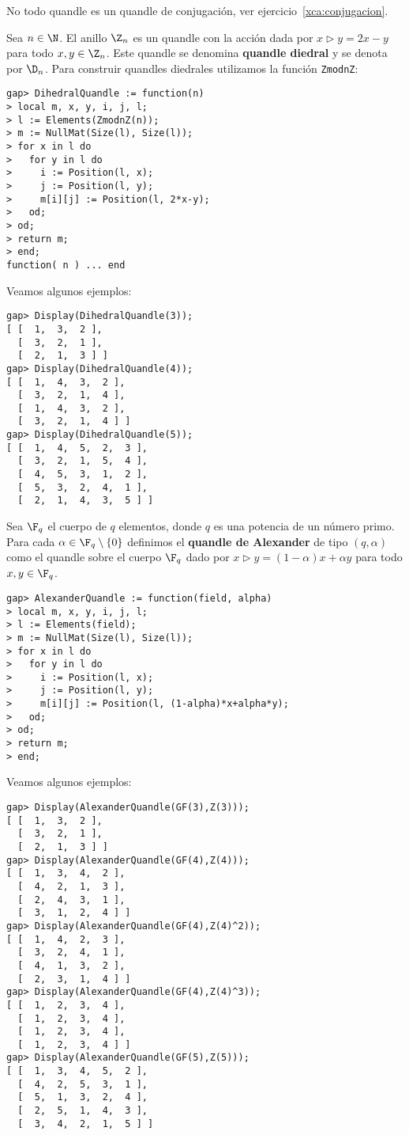 \begin{remark}
	No todo quandle es un quandle de conjugación, ver
	ejercicio~\ref{xca:conjugacion}.  
\end{remark}

\begin{example}
Sea $n\in\N$. El anillo $\Z_n$ es un quandle con la acción dada por
$x\triangleright y=2x-y$ para todo $x,y\in\Z_n$. Este quandle se denomina
\textbf{quandle diedral} y se denota por $\D_n$. Para construir quandles
diedrales utilizamos la función \lstinline{ZmodnZ}:
\begin{lstlisting}
gap> DihedralQuandle := function(n)
> local m, x, y, i, j, l;
> l := Elements(ZmodnZ(n));
> m := NullMat(Size(l), Size(l));
> for x in l do
>   for y in l do
>     i := Position(l, x);
>     j := Position(l, y);
>     m[i][j] := Position(l, 2*x-y);
>   od;
> od;
> return m;
> end;
function( n ) ... end
\end{lstlisting}
Veamos algunos ejemplos:
\begin{lstlisting}
gap> Display(DihedralQuandle(3));
[ [  1,  3,  2 ],
  [  3,  2,  1 ],
  [  2,  1,  3 ] ]
gap> Display(DihedralQuandle(4));
[ [  1,  4,  3,  2 ],
  [  3,  2,  1,  4 ],
  [  1,  4,  3,  2 ],
  [  3,  2,  1,  4 ] ]
gap> Display(DihedralQuandle(5));
[ [  1,  4,  5,  2,  3 ],
  [  3,  2,  1,  5,  4 ],
  [  4,  5,  3,  1,  2 ],
  [  5,  3,  2,  4,  1 ],
  [  2,  1,  4,  3,  5 ] ]
\end{lstlisting}
\end{example}

\begin{example}
Sea $\F_q$ el cuerpo de $q$ elementos, donde $q$ es una potencia de un número
primo. Para cada $\alpha\in\F_q\setminus\{0\}$ definimos el \textbf{quandle de
Alexander} de tipo $(q,\alpha)$ como el quandle sobre el cuerpo $\F_q$ dado por
$x\triangleright y=(1-\alpha)x+\alpha y$ para todo $x,y\in\F_q$.
\begin{lstlisting}
gap> AlexanderQuandle := function(field, alpha)
> local m, x, y, i, j, l;
> l := Elements(field);
> m := NullMat(Size(l), Size(l));
> for x in l do
>   for y in l do
>     i := Position(l, x);
>     j := Position(l, y);
>     m[i][j] := Position(l, (1-alpha)*x+alpha*y);
>   od;
> od;
> return m;
> end;
\end{lstlisting}
Veamos algunos ejemplos:
\begin{lstlisting}
gap> Display(AlexanderQuandle(GF(3),Z(3)));
[ [  1,  3,  2 ],
  [  3,  2,  1 ],
  [  2,  1,  3 ] ]
gap> Display(AlexanderQuandle(GF(4),Z(4)));
[ [  1,  3,  4,  2 ],
  [  4,  2,  1,  3 ],
  [  2,  4,  3,  1 ],
  [  3,  1,  2,  4 ] ]
gap> Display(AlexanderQuandle(GF(4),Z(4)^2));
[ [  1,  4,  2,  3 ],
  [  3,  2,  4,  1 ],
  [  4,  1,  3,  2 ],
  [  2,  3,  1,  4 ] ]
gap> Display(AlexanderQuandle(GF(4),Z(4)^3));
[ [  1,  2,  3,  4 ],
  [  1,  2,  3,  4 ],
  [  1,  2,  3,  4 ],
  [  1,  2,  3,  4 ] ]
gap> Display(AlexanderQuandle(GF(5),Z(5)));
[ [  1,  3,  4,  5,  2 ],
  [  4,  2,  5,  3,  1 ],
  [  5,  1,  3,  2,  4 ],
  [  2,  5,  1,  4,  3 ],
  [  3,  4,  2,  1,  5 ] ]
\end{lstlisting}
\end{example}

